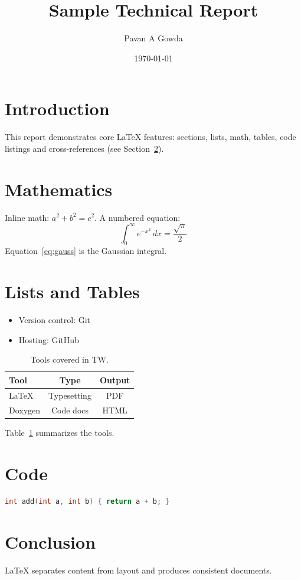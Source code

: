 \documentclass[12pt,a4paper]{article}
\title{Sample Technical Report}
\author{Pavan A Gowda}
\date{\today}
\begin{document}
\maketitle
\tableofcontents
\newpage

\section{Introduction}
This report demonstrates core \LaTeX{} features: sections, lists, math,
tables, code listings and cross-references (see Section~\ref{sec:math}).

\section{Mathematics}\label{sec:math}
Inline math: $a^2 + b^2 = c^2$. A numbered equation:
\begin{equation}
  \int_0^\infty e^{-x^2}\,dx = \frac{\sqrt{\pi}}{2}
  \label{eq:gauss}
\end{equation}
Equation~\eqref{eq:gauss} is the Gaussian integral.

\section{Lists and Tables}
\begin{itemize}
  \item Version control: Git
  \item Hosting: GitHub
\end{itemize}

\begin{table}[h]
  \centering
  \begin{tabular}{lcc}
    \toprule
    Tool & Type & Output \\
    \midrule
    LaTeX   & Typesetting & PDF  \\
    Doxygen & Code docs   & HTML \\
    \bottomrule
  \end{tabular}
  \caption{Tools covered in TW.}
  \label{tab:tools}
\end{table}
Table~\ref{tab:tools} summarizes the tools.

\section{Code}
\begin{lstlisting}[language=C]
int add(int a, int b) { return a + b; }
\end{lstlisting}

\section{Conclusion}
\LaTeX{} separates content from layout and produces consistent documents.
\end{document}
